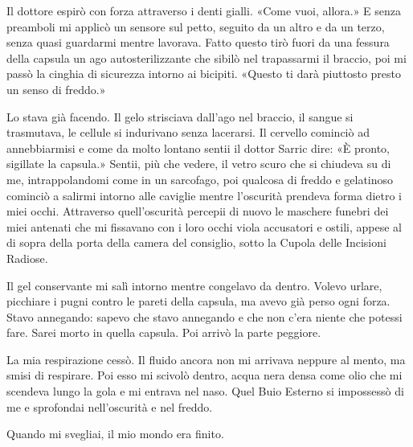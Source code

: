 Il dottore espirò con forza attraverso i denti gialli. «Come vuoi,
allora.» E senza preamboli mi applicò un sensore sul petto, seguito da
un altro e da un terzo, senza quasi guardarmi mentre lavorava. Fatto
questo tirò fuori da una fessura della capsula un ago autosterilizzante
che sibilò nel trapassarmi il braccio, poi mi passò la cinghia di
sicurezza intorno ai bicipiti. «Questo ti darà piuttosto presto un senso
di freddo.»

Lo stava già facendo. Il gelo strisciava dall'ago nel braccio, il sangue
si trasmutava, le cellule si indurivano senza lacerarsi. Il cervello
cominciò ad annebbiarmisi e come da molto lontano sentii il dottor
Sarric dire: «È pronto, sigillate la capsula.» Sentii, più che vedere,
il vetro scuro che si chiudeva su di me, intrappolandomi come in un
sarcofago, poi qualcosa di freddo e gelatinoso cominciò a salirmi
intorno alle caviglie mentre l'oscurità prendeva forma dietro i miei
occhi. Attraverso quell'oscurità percepii di nuovo le maschere funebri
dei miei antenati che mi fissavano con i loro occhi viola accusatori e
ostili, appese al di sopra della porta della camera del consiglio, sotto
la Cupola delle Incisioni Radiose.

Il gel conservante mi salì intorno mentre congelavo da dentro. Volevo
urlare, picchiare i pugni contro le pareti della capsula, ma avevo già
perso ogni forza. Stavo annegando: sapevo che stavo annegando e che non
c'era niente che potessi fare. Sarei morto in quella capsula. Poi arrivò
la parte peggiore.

La mia respirazione cessò. Il fluido ancora non mi arrivava neppure al
mento, ma smisi di respirare. Poi esso mi scivolò dentro, acqua nera
densa come olio che mi scendeva lungo la gola e mi entrava nel naso.
Quel Buio Esterno si impossessò di me e sprofondai nell'oscurità e nel
freddo.

Quando mi svegliai, il mio mondo era finito.

